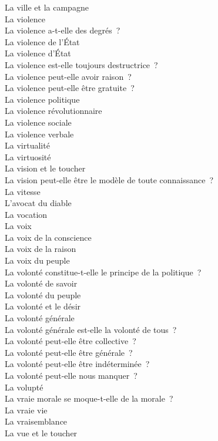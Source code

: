 \documentclass[a4paper,12pt]{article}
\begin{document}
La ville et la campagne \\
La violence \\
La violence a-t-elle des degrés ? \\
La violence de l'État \\
La violence d'État \\
La violence est-elle toujours destructrice ? \\
La violence peut-elle avoir raison ? \\
La violence peut-elle être gratuite ? \\
La violence politique \\
La violence révolutionnaire \\
La violence sociale \\
La violence verbale \\
La virtualité \\
La virtuosité \\
La vision et le toucher \\
La vision peut-elle être le modèle de toute connaissance ? \\
La vitesse \\
L'avocat du diable \\
La vocation \\
La voix \\
La voix de la conscience \\
La voix de la raison \\
La voix du peuple \\
La volonté constitue-t-elle le principe de la politique ? \\
La volonté de savoir \\
La volonté du peuple \\
La volonté et le désir \\
La volonté générale \\
La volonté générale est-elle la volonté de tous ? \\
La volonté peut-elle être collective ? \\
La volonté peut-elle être générale ? \\
La volonté peut-elle être indéterminée ? \\
La volonté peut-elle nous manquer ? \\
La volupté \\
La vraie morale se moque-t-elle de la morale ? \\
La vraie vie \\
La vraisemblance \\
La vue et le toucher \\
\end{document}
